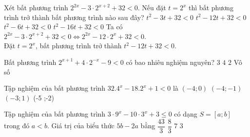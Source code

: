 \begin{ex}%
	Xét bất phương trình $2^{2x}-3\cdot2^{x+2}+32<0$. Nếu đặt $t=2^x$ thì bất phương trình trở thành bất phương trình nào sau đây?
	\choice
	{$t^2-3t+32<0$}
	{\True $t^2-12t+32<0$}
	{$t^2-6t+32<0$}
	{$t^2-16t+32<0$}
	\loigiai
	{
		Ta có $2^{2x}-3\cdot2^{x+2}+32<0 \Leftrightarrow 2^{2x}-12\cdot2^{x}+32<0$. \\
		Đặt $t=2^x$, bất phương trình trở thành $t^2-12t+32<0$.
	}
\end{ex}



\begin{ex}%
	Bất phương trình $2^{x+1}+4\cdot 2^{-x}-9<0$ có bao nhiêu nghiệm nguyên?
	\choice
	{$3$}
	{$4$}
	{\True $2$}
	{Vô số}
\end{ex}






\begin{ex}%
	Tập nghiệm của bất phương trình $32.4^x-18.2^x+1<0$ là \choice
	{$(-4 ; 0)$}
	{\True $ (-4 ;-1) $}
	{$ (-3 ; 1) $}
	{$ $(-5 ;-2)$ $}
\end{ex}


\begin{ex}%
	Tập nghiệm của bất phương trình $3\cdot 9^x-10\cdot 3^x+3\le 0$ có dạng $S=[a;b]$ trong đó $a<b$. Giá trị của biểu thức $5b-2a$ bằng
	\choice
	{$\dfrac{43}{3}$}
	{$\dfrac{8}{3}$}
	{\True $7$}
	{$3$}
\end{ex}


